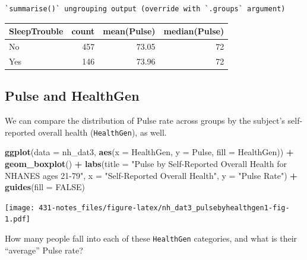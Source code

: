 \documentclass[
]{book}
\newenvironment{Shaded}{\begin{snugshade}}{\end{snugshade}}
\newcommand{\DataTypeTok}[1]{\textcolor[rgb]{0.13,0.29,0.53}{#1}}
\newcommand{\DecValTok}[1]{\textcolor[rgb]{0.00,0.00,0.81}{#1}}
\newcommand{\KeywordTok}[1]{\textcolor[rgb]{0.13,0.29,0.53}{\textbf{#1}}}
\newcommand{\NormalTok}[1]{#1}
\newcommand{\OperatorTok}[1]{\textcolor[rgb]{0.81,0.36,0.00}{\textbf{#1}}}
\newcommand{\OtherTok}[1]{\textcolor[rgb]{0.56,0.35,0.01}{#1}}
\newcommand{\StringTok}[1]{\textcolor[rgb]{0.31,0.60,0.02}{#1}}
\begin{document}
\begin{verbatim}
`summarise()` ungrouping output (override with `.groups` argument)
\end{verbatim}

\begin{tabular}{l|r|r|r}
\hline
SleepTrouble & count & mean(Pulse) & median(Pulse)\\
\hline
No & 457 & 73.05 & 72\\
\hline
Yes & 146 & 73.96 & 72\\
\hline
\end{tabular}

\hypertarget{pulse-and-healthgen}{%
\subsection{Pulse and HealthGen}\label{pulse-and-healthgen}}

We can compare the distribution of Pulse rate across groups by the subject's self-reported overall health (\texttt{HealthGen}), as well.

\begin{Shaded}
\begin{Highlighting}[]
\KeywordTok{ggplot}\NormalTok{(}\DataTypeTok{data =}\NormalTok{ nh_dat3, }\KeywordTok{aes}\NormalTok{(}\DataTypeTok{x =}\NormalTok{ HealthGen, }\DataTypeTok{y =}\NormalTok{ Pulse, }\DataTypeTok{fill =}\NormalTok{ HealthGen)) }\OperatorTok{+}\StringTok{ }
\StringTok{    }\KeywordTok{geom_boxplot}\NormalTok{() }\OperatorTok{+}
\StringTok{    }\KeywordTok{labs}\NormalTok{(}\DataTypeTok{title =} \StringTok{"Pulse by Self-Reported Overall Health for NHANES ages 21-79"}\NormalTok{,}
         \DataTypeTok{x =} \StringTok{"Self-Reported Overall Health"}\NormalTok{, }\DataTypeTok{y =} \StringTok{"Pulse Rate"}\NormalTok{) }\OperatorTok{+}\StringTok{ }
\StringTok{    }\KeywordTok{guides}\NormalTok{(}\DataTypeTok{fill =} \OtherTok{FALSE}\NormalTok{) }
\end{Highlighting}
\end{Shaded}

\texttt{[image: 431-notes\_files/figure-latex/nh\_dat3\_pulsebyhealthgen1-fig-1.pdf]}

How many people fall into each of these \texttt{HealthGen} categories, and what is their ``average'' Pulse rate?

\begin{Shaded}
\end{Shaded}
\end{document}

